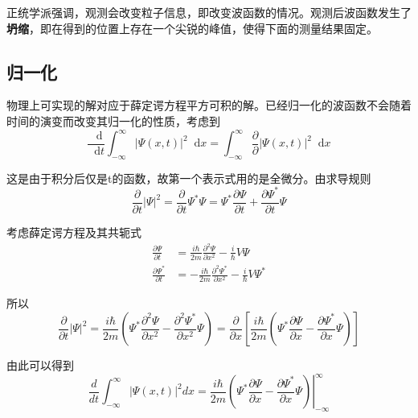 \documentclass[UTF8]{ctexart}
\newcommand*{\dif}{\mathop{}\!\mathrm{d}}
\begin{document}
    正统学派强调，观测会改变粒子信息，即改变波函数的情况。观测后波函数发生了\textbf{坍缩}，即在得到的位置上存在一个尖锐的峰值，使得下面的测量结果固定。

    \subsection{归一化}
    物理上可实现的解对应于薛定谔方程平方可积的解。已经归一化的波函数不会随着时间的演变而改变其归一化的性质，考虑到
    \begin{equation}
        \frac{\dif}{\dif t} \int_{-\infty}^{\infty} |\Psi(x,t)|^2 \dif x = \int_{-\infty}^{\infty} \frac{\partial}{\partial} |\Psi(x,t)|^2 \dif x
    \end{equation}

\noindent 这是由于积分后仅是t的函数，故第一个表示式用的是全微分。由求导规则
    \begin{equation}
        \frac{\partial}{\partial t}|\Psi|^{2}=\frac{\partial}{\partial t} \Psi^{*} \Psi=\Psi^{*} \frac{\partial \Psi}{\partial t}+\frac{\partial \Psi^{*}}{\partial t} \Psi
    \end{equation}

\noindent 考虑薛定谔方程及其共轭式
    \begin{equation}
        \begin{aligned}
            \frac{\partial \Psi}{\partial t}&=\frac{i \hbar}{2 m} \frac{\partial^{2} \Psi}{\partial x^{2}}-\frac{i}{\hbar} V \Psi\\
            \frac{\partial \Psi^*}{\partial t}&=-\frac{i \hbar}{2 m} \frac{\partial^{2} \Psi^*}{\partial x^{2}}-\frac{i}{\hbar} V \Psi^*
        \end{aligned}
    \end{equation}

\noindent 所以
    \begin{equation}
        \frac{\partial}{\partial t}|\Psi|^{2}=\frac{i \hbar}{2 m}\left(\Psi^{*} \frac{\partial^{2} \Psi}{\partial x^{2}}-\frac{\partial^{2} \Psi^{*}}{\partial x^{2}} \Psi\right)=\frac{\partial}{\partial x}\left[\frac{i \hbar}{2 m}\left(\Psi^{*} \frac{\partial \Psi}{\partial x}-\frac{\partial \Psi^{*}}{\partial x} \Psi\right)\right]
    \end{equation}

\noindent 由此可以得到
    \begin{equation}
        \frac{d}{d t} \int_{-\infty}^{\infty}|\Psi(x, t)|^{2} d x=\left.\frac{i \hbar}{2 m}\left(\Psi^{*} \frac{\partial \Psi}{\partial x}-\frac{\partial \Psi^{*}}{\partial x} \Psi\right)\right|_{-\infty} ^{\infty}
    \end{equation}
\end{document}
